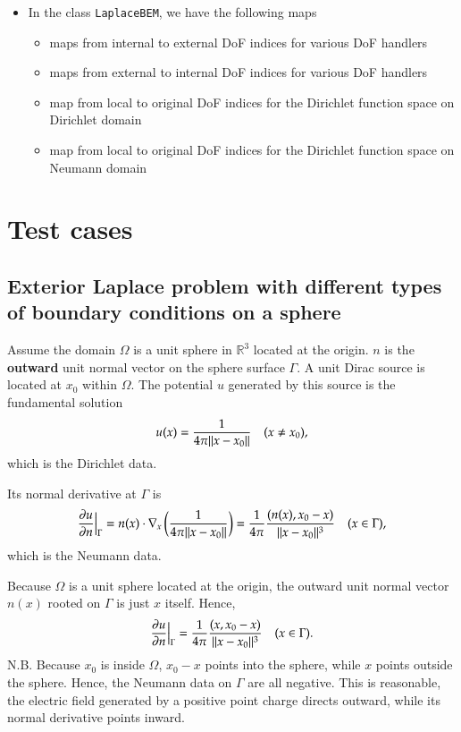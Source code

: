 \documentclass[11pt, a4paper]{article}
\begin{document}
\begin{itemize}
\item In the class \texttt{LaplaceBEM}, we have the following maps
  \begin{itemize}
  \item maps from internal to external DoF indices for various DoF handlers
  \item maps from external to internal DoF indices for various DoF handlers
  \item map from local to original DoF indices for the Dirichlet function space on Dirichlet domain
  \item map from local to original DoF indices for the Dirichlet function space on Neumann domain
  \end{itemize}
\end{itemize}


\section{Test cases}

\subsection{Exterior Laplace problem with different types of boundary conditions on a
  sphere}
\label{sec:testcase-exterior-laplace}

Assume the domain $\Omega$ is a unit sphere in $\mathbb{R}^3$ located at the origin. $n$ is the
\textbf{outward} unit normal vector on the sphere surface $\Gamma$. A unit Dirac source is
located at $x_0$ within $\Omega$. The potential $u$ generated by this source is the
fundamental solution
\begin{equation}
  u(x) = \frac{1}{4\pi\lVert x-x_0\rVert} \quad (x\neq x_0),
\end{equation}
which is the Dirichlet data.

Its normal derivative at $\Gamma$ is
\begin{equation}
  \frac{\partial u}{\partial n}\Big\vert_{\Gamma} = n(x)\cdot\nabla_x
  \left( \frac{1}{4\pi\lVert x-x_0\rVert} \right) = \frac{1}{4\pi}\frac{(n(x),
    x_0-x)}{\lVert x-x_0\rVert^3} \quad (x\in\Gamma),
\end{equation}
which is the Neumann data.

Because $\Omega$ is a unit sphere located at the origin, the outward unit normal vector
$n(x)$ rooted on $\Gamma$ is just $x$ itself. Hence,
\begin{equation}
  \frac{\partial u}{\partial n}\Big\vert_{\Gamma} = \frac{1}{4\pi}\frac{(x,
    x_0-x)}{\lVert x-x_0\rVert^3} \quad (x\in\Gamma).
\end{equation}
N.B. Because $x_0$ is inside $\Omega$, $x_0-x$ points into the sphere, while $x$ points
outside the sphere. Hence, the Neumann data on $\Gamma$ are all negative. This is
reasonable, the electric field generated by a positive point charge directs outward, while
its normal derivative points inward.
\end{document}

